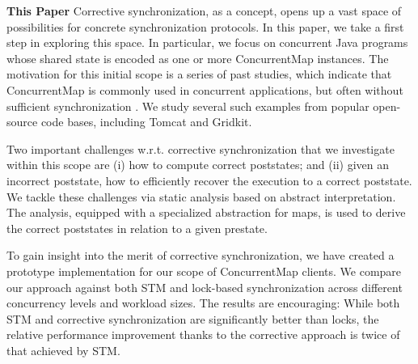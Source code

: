 \noindent \textbf{This Paper} Corrective synchronization, as a concept, opens up a vast space of possibilities for concrete synchronization protocols. In this paper, we take a first step in exploring this space. In particular, we focus on concurrent Java programs whose shared state is encoded as one or more {\sf ConcurrentMap} instances. The motivation for this initial scope is a series of past studies, which indicate that {\sf ConcurrentMap} is commonly used in concurrent applications, but often without sufficient synchronization \cite{oopsla/ShachamBASVY11,issta/ShachamYGABSV14}. We study several such examples from popular open-source code bases, including Tomcat and Gridkit.

Two important challenges w.r.t. corrective synchronization that we investigate within this scope are (i) how to compute correct poststates; and (ii) given an incorrect poststate, how to efficiently recover the execution to a correct poststate. 
We tackle these challenges via static analysis based on abstract interpretation. The analysis, equipped with a specialized abstraction for maps, is used to derive the correct poststates in relation to a given prestate. 

To gain insight into the merit of corrective synchronization, we have created a prototype implementation for our scope of {\sf ConcurrentMap} clients. We compare our approach against both STM and lock-based synchronization across different concurrency levels and workload sizes. The results are encouraging: While both STM and corrective synchronization are significantly better than locks, the relative performance improvement thanks to the corrective approach is twice of that achieved by STM.
%
%
%
%

